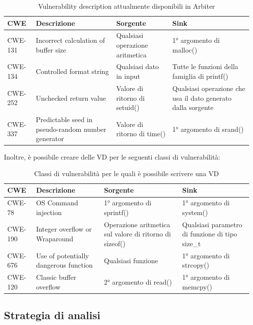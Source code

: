 \documentclass[../main.tex]{subfiles}
\begin{document}
\begin{table}[H]
\centering
\begin{tabularx}{\textwidth}{|l|X|X|X|}
\hline
CWE     & Descrizione                                        & Sorgente                        & Sink                                                                                                   \\ \hline
CWE-131 & Incorrect calculation of buffer size               & Qualsiasi operazione aritmetica & 1° argomento di malloc()                                                                               \\ \hline
CWE-134 & Controlled format string                           & Qualsiasi dato in input         & Tutte le funzioni della famiglia di printf()                                                           \\ \hline
CWE-252 & Unchecked return value                             & Valore di ritorno di setuid()   & Qualsiasi operazione che usa il dato generato dalla sorgente                                           \\ \hline
CWE-337 & Predictable seed in pseudo-random number generator & Valore di ritorno di time()     & 1° argomento di srand()                                                                                \\ \hline
\end{tabularx}
\caption{Vulnerability description attualmente disponibili in Arbiter}
\end{table}
\noindent
Inoltre, è possibile creare delle VD per le seguenti classi di vulnerabilità:
\begin{table}[H]
\centering
\begin{tabularx}{\textwidth}{|l|X|X|X|}
\hline
CWE     & Descrizione                                        & Sorgente                        & Sink                                                                                                   \\ \hline
CWE-78 & OS Command injection& 1° argomento di sprintf() & 1° argomento di system()                                                                               \\ \hline
CWE-190 & Integer overflow or Wraparound                           & Operazione aritmetica sul valore di ritorno di sizeof()         & Qualsiasi parametro di funzione di tipo size\_t                                                           \\ \hline
CWE-676 & Use of potentially dangerous function                             & Qualsiasi funzione   & 1° argomento di strcopy()                              \\ \hline
CWE-120 & Classic buffer overflow     & 2° argomento di read() & 1° argomento di memcpy()                                                                                \\ \hline
\end{tabularx}
\caption{Classi di vulnerabilità per le quali è possibile scrivere una VD}
\end{table}
\subsection{Strategia di analisi}
\end{document}

